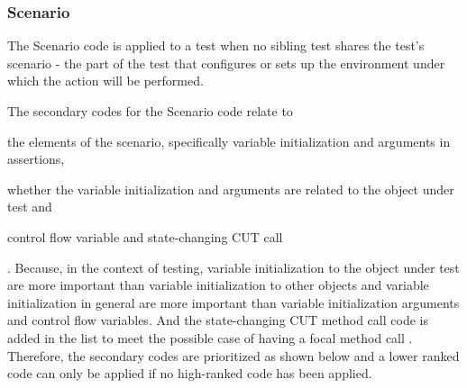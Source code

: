 \subsubsection{Scenario}

The Scenario code is applied to a test when no sibling test shares the test’s scenario - the part of the test that configures or sets up the environment under which the action will be performed.

The secondary codes for the Scenario code relate to 
\begin{enumerate*}[label=(\roman*)]
    \item the elements of the scenario, specifically variable initialization and arguments in assertions, 
    \item whether the variable initialization and arguments are related to the object under test and 
    \item control flow variable and state-changing CUT call
\end{enumerate*}.
Because, in the context of testing, variable initialization to the object under test are more important than variable initialization to other objects and variable initialization in general are more important than variable initialization arguments and control flow variables.
%
And the state-changing CUT method call code is added in the list to meet the possible case of having a focal method call \cite{ghafari2015automatically}.
%
Therefore, the secondary codes are prioritized as shown below and a lower ranked code can only be applied if no high-ranked code has been applied.

